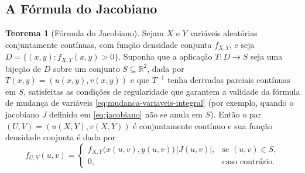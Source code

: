 \documentclass[12pt,portuguese]{article}
\theoremstyle{definition}
\newtheorem{theorem}{Teorema}
\theoremstyle{plainexercise}
\theoremstyle{starredexercise}
\theoremstyle{definition}
\begin{document}
\subsection{A Fórmula do Jacobiano}\label{subsec:formula-jacobiano}
\begin{theorem}[Fórmula do Jacobiano]\label{thm:formula-jacobiano}
Sejam $X$ e $Y$ variáveis aleatórias conjuntamente contínuas, com função
densidade conjunta $f_{X,Y}$, e seja
$D = \{(x, y) : f_{X,Y}(x, y) > 0\}$.
Suponha que a aplicação $T:D\to S$
seja uma bijeção de $D$ sobre um conjunto $S \subseteq \mathbb{R}^2$,
dada por $T(x, y) = (u(x, y), v(x, y))$ e que
$T^{-1}$ tenha derivadas parciais contínuas em $S$, satisfeitas as
condições de regularidade que garantem a validade da fórmula de mudança de
variáveis \eqref{eq:mudanca-variaveis-integral} (por exemplo, quando o
jacobiano $J$ definido em \eqref{eq:jacobiano} não se anula em $S$). Então
o par $(U, V) = (u(X, Y), v(X, Y))$ é conjuntamente contínuo e sua função
densidade conjunta é dada por
\begin{equation}\label{eq:densidade-transformada}
  f_{U,V}(u, v) =
  \begin{cases}
    f_{X,Y}\bigl(x(u, v), y(u, v)\bigr)\,|J(u, v)|
    , & \text{se } (u, v) \in S,
    \\[0.2cm]
    0, & \text{caso contrário}.
  \end{cases}
\end{equation}
\end{theorem}
\end{document}
